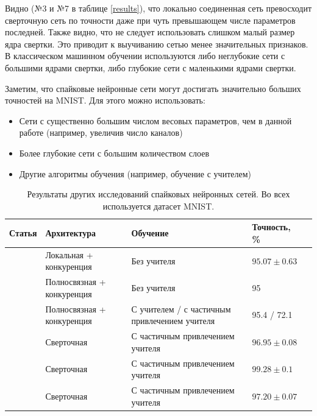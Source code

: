 \documentclass[a4paper]{article}
\begin{document}

Видно (№3 и №7 в таблице \ref{results}), что локально соединенная сеть превосходит сверточную сеть по точности даже при чуть превышающем числе параметров последней. Также видно, что не следует использовать слишком малый размер ядра свертки. Это приводит к выучиванию сетью менее значительных признаков. В классическом машинном обучении используются либо неглубокие сети с большими ядрами свертки, либо глубокие сети с маленькими ядрами свертки.

Заметим, что спайковые нейронные сети могут достигать значительно больших точностей на MNIST. Для этого можно использовать:
\begin{itemize}
\item Сети с существенно большим числом весовых параметров, чем в данной работе (например, увеличив число каналов)
\item Более глубокие сети с большим количеством слоев
\item Другие алгоритмы обучения (например, обучение с учителем)
\end{itemize} 

\begin{table}[H]
 \caption{Результаты других исследований спайковых нейронных сетей. Во всех используется датасет MNIST.}
\begin{center}
\begin{tabular}{|l|p{4cm}|p{7cm}|l|l|}
\hline
Статья & Архитектура & Обучение & Точность, \% \\
\hline
{\cite{saunders2019locally}} & {Локальная + конкуренция} & {Без учителя} & {$95.07 \pm 0.63$}\\
\hline
{\cite{mnist2}} & {Полносвязная + конкуренция} & {Без учителя} & {95}\\
\hline
{\cite{MaxActiv1}} & {Полносвязная + конкуренция} & {С учителем / с частичным привлечением учителя} & {95.4 / 72.1}\\
\hline
{\cite{conv1}} & {Сверточная} & {С частичным привлечением учителя} & {$96.95 \pm 0.08$}\\
\hline
{\cite{conv2}} & {Сверточная} & {С частичным привлечением учителя} & {$99.28 \pm 0.1$}\\
\hline
{\cite{conv3}} & {Сверточная} & {С частичным привлечением учителя} & {$97.20 \pm 0.07$}\\
\hline
\end{tabular}
\end{center}
\end{table}
\end{document}
